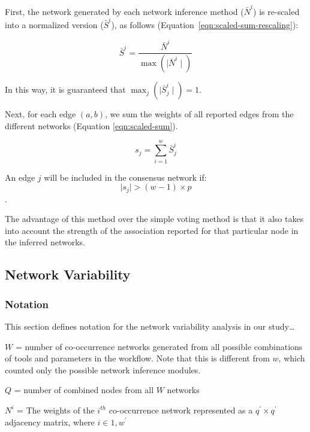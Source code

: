   First, the network generated by each network inference method ($\bar{N}^i$) is re-scaled into a normalized version ($\bar{S}^i$), as follows  (Equation~\ref{eqn:scaled-sum-rescaling}):


  \begin{equation}
    \bar{S}^{i} = \frac{\bar{N}^{i}}{\max(\mid \bar{N}^{i} \mid)}
    \label{eqn:scaled-sum-rescaling}
  \end{equation}

    In this way, it is guaranteed that $\max_{j}(\mid \bar{S}^i_j \mid) = 1$.


  Next, for each edge $(a,b)$, we sum the weights of all reported edges from the different networks (Equation \ref{eqn:scaled-sum}).

  \begin{equation}
    s_j = \sum_{i=1}^{w} \bar{S}^i_j
    \label{eqn:scaled-sum}
  \end{equation}


  An edge $j$ will be included in the consensus network if:
  \begin{equation}
    \mid s_j \mid > (w - 1) \times p
    \label{eq:scaled-sum2}
  \end{equation}.

  The advantage of this method over the simple voting method is that it also takes into account the strength of the association reported for that particular node in the inferred networks.

  \subsection*{Network Variability}
  \vspace{-5mm}


  \subsubsection*{Notation}
  \vspace{-5mm}
  This section defines notation for the network variability analysis in our study\dots

  $W$ =  number of co-occurrence networks generated from all possible combinations of tools and parameters in the workflow. Note that this is different from $w$, which counted only the possible network inference modules.

  $Q$ =  number of combined nodes from all $W$ networks

  $N^i$ = The weights of the $i^{th}$ co-occurrence network represented as a $q^\prime \times q^\prime$ adjacency matrix, where $i \in {1, w^\prime}$

